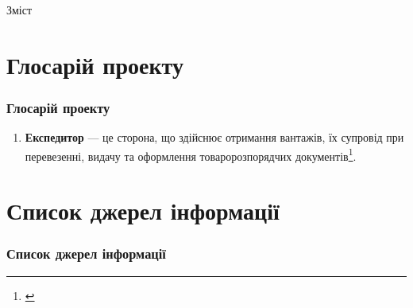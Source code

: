 \documentclass[aspectratio=169]{beamer}
\subtitle{\textcolor{secondary}{\textit{\small Виконав: ст. групи КН-34г}} \\ Чепурний А. С. \\[1ex] \textcolor{secondary}{\textit{\small Керівник дипломної роботи: професор, доктор технічних наук}} \\ Годлевський М. Д.}
\author{}
\date{Харків 2017}
\begin{document}
    \frame{\titlepage}

    \begin{frame}{Зміст}
        \tableofcontents
    \end{frame}

    \section{Глосарій проекту}
    \begin{frame}
        \frametitle{Глосарій проекту}
        {\footnotesize
        \begin{enumerate}
            \item \textbf{Експедитор} --- це сторона, що здійснює отримання вантажів, їх супровід при перевезенні, видачу та оформлення товаророзпорядчих документів\footnote[frame]{\cite{Kusluy2010}}.
        \end{enumerate}
        }
    \end{frame}

    \section{Список джерел інформації}
    \begin{frame}
        \frametitle{Список джерел інформації}
        
    \end{frame}
\end{document}
